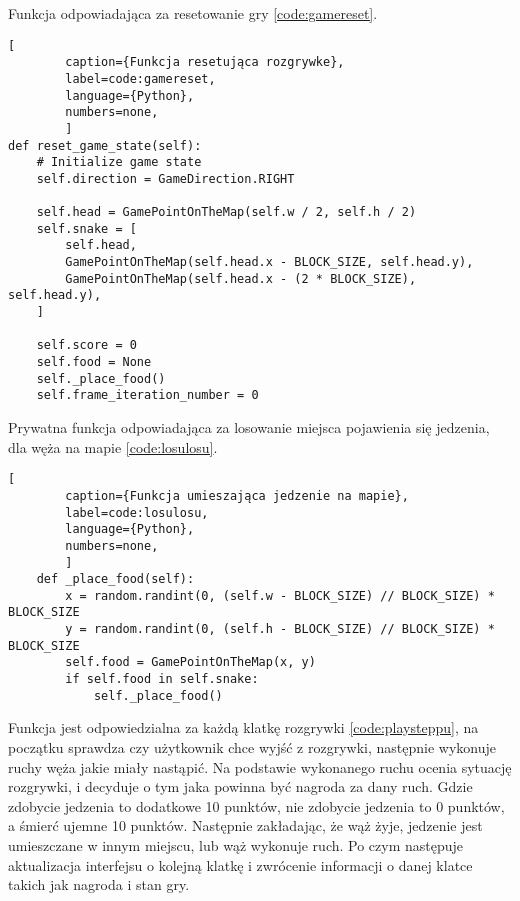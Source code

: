 \clearpage

Funkcja odpowiadająca za resetowanie gry \ref{code:gamereset}.

\begin{onepage}
    \begin{lstlisting}[
        caption={Funkcja resetująca rozgrywke},
        label=code:gamereset,
        language={Python},
        numbers=none,
        ]
def reset_game_state(self):
    # Initialize game state
    self.direction = GameDirection.RIGHT

    self.head = GamePointOnTheMap(self.w / 2, self.h / 2)
    self.snake = [
        self.head,
        GamePointOnTheMap(self.head.x - BLOCK_SIZE, self.head.y),
        GamePointOnTheMap(self.head.x - (2 * BLOCK_SIZE), self.head.y),
    ]

    self.score = 0
    self.food = None
    self._place_food()
    self.frame_iteration_number = 0
    \end{lstlisting}
\end{onepage}


Prywatna funkcja odpowiadająca za losowanie miejsca pojawienia się jedzenia, dla węża na mapie \ref{code:losulosu}.

\begin{onepage}
    \begin{lstlisting}[
        caption={Funkcja umieszająca jedzenie na mapie},
        label=code:losulosu,
        language={Python},
        numbers=none,
        ]
    def _place_food(self):
        x = random.randint(0, (self.w - BLOCK_SIZE) // BLOCK_SIZE) * BLOCK_SIZE
        y = random.randint(0, (self.h - BLOCK_SIZE) // BLOCK_SIZE) * BLOCK_SIZE
        self.food = GamePointOnTheMap(x, y)
        if self.food in self.snake:
            self._place_food()
    \end{lstlisting}
\end{onepage}

\clearpage

Funkcja  jest odpowiedzialna za każdą klatkę rozgrywki \ref{code:playsteppu}, na początku sprawdza czy użytkownik chce wyjść z rozgrywki, następnie wykonuje ruchy węża jakie miały nastąpić. Na podstawie wykonanego ruchu ocenia sytuację rozgrywki, i decyduje o tym jaka powinna być nagroda za dany ruch. Gdzie zdobycie jedzenia to dodatkowe 10 punktów, nie zdobycie jedzenia to 0 punktów, a śmierć ujemne 10 punktów. Następnie zakładając, że wąż żyje, jedzenie jest umieszczane w innym miejscu, lub wąż wykonuje ruch. Po czym następuje aktualizacja interfejsu o kolejną klatkę i zwrócenie informacji o danej klatce takich jak nagroda i stan gry.

